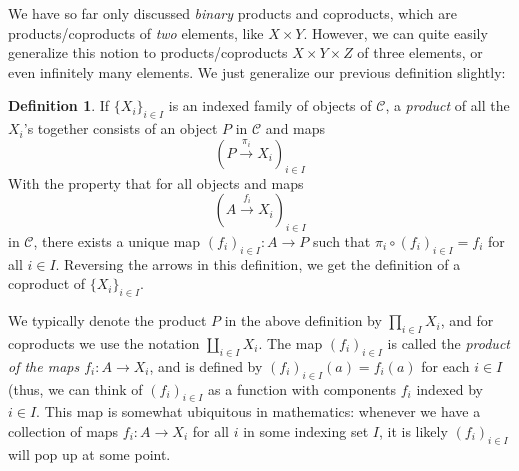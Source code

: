 \documentclass[10pt,oneside]{book}
\def\~#1{\mathscr{#1}}
\def\To#1{\xrightarrow{#1}}
\theoremstyle{plain}
\theoremstyle{definition}
\newtheorem{defn}[thm]{Definition}
\theoremstyle{remark}
\numberwithin{equation}{section}
\numberwithin{figure}{section}
\begin{document}
We have so far only discussed \emph{binary} products and coproducts, which are products/coproducts of \emph{two} elements, like $X \times Y$. However, we can quite easily generalize this notion to products/coproducts $X \times Y \times Z$ of three elements, or even infinitely many elements. We just generalize our previous definition slightly:

\begin{defn}
\label{defn:gen_prod}
If $\{X_i\}_{i \in I}$ is an indexed family of objects of $\~C$, a \emph{product} of all the $X_i$'s together consists of an object $P$ in $\~C$ and maps
\[\left(P \To{\pi_i} X_i \right)_{i \in I}\]
    With the property that for all objects and maps
\[\left(A \To{f_i} X_i \right)_{i \in I}\]
in $\~C$, there exists a unique map $(f_i)_{i \in I}: A \to P$ such that $\pi_i \circ (f_i)_{i \in I} = f_i$ for all $i \in I$. Reversing the arrows in this definition, we get the definition of a coproduct of $\{X_i\}_{i \in I}$.
\end{defn}
We typically denote the product $P$ in the above definition by $\prod_{i \in I} X_i$, and for coproducts we use the notation $\coprod_{i \in I} X_i$. The map $(f_i)_{i \in I}$ is called the \emph{product of the maps $f_i: A \to X_i$}, and is defined by $(f_i)_{i \in I}(a) = f_i(a)$ for each $i \in I$ (thus, we can think of $(f_i)_{i \in I}$ as a function with components $f_i$ indexed by $i \in I$. This map is somewhat ubiquitous in mathematics: whenever we have a collection of maps $f_i: A \to X_i$ for all $i$ in some indexing set $I$, it is likely $(f_i)_{i \in I}$ will pop up at some point.  
\end{document}
